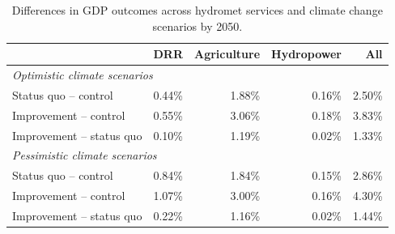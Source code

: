 \begin{table}[htb]
\caption{Differences in GDP outcomes across hydromet services and climate change scenarios by 2050.}
\label{tab:gdp_differences}
\centering
\begin{tabular}{lrrrr}
\toprule
 & DRR & Agriculture & Hydropower & All \\
\midrule
\multicolumn{5}{l}{\textit{Optimistic climate scenarios}} \\
\midrule
Status quo -- control      & 0.44\% & 1.88\% & 0.16\% & 2.50\% \\
Improvement -- control     & 0.55\% & 3.06\% & 0.18\% & 3.83\% \\
Improvement -- status quo  & 0.10\% & 1.19\% & 0.02\% & 1.33\% \\
\midrule
\multicolumn{5}{l}{\textit{Pessimistic climate scenarios}} \\
\midrule
Status quo -- control      & 0.84\% & 1.84\% & 0.15\% & 2.86\% \\
Improvement -- control     & 1.07\% & 3.00\% & 0.16\% & 4.30\% \\
Improvement -- status quo  & 0.22\% & 1.16\% & 0.02\% & 1.44\% \\
\bottomrule
\end{tabular}
\end{table}
